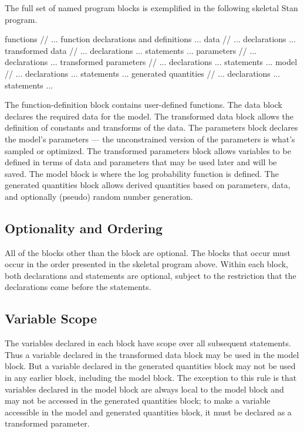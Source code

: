 The full set of named program blocks is exemplified in the following
skeletal Stan program.
%
\begin{stancode}
functions {
  // ... function declarations and definitions ...
}
data {
  // ... declarations ...
}
transformed data {
   // ... declarations ... statements ...
}
parameters {
   // ... declarations ...
}
transformed parameters {
   // ... declarations ... statements ...
}
model {
   // ... declarations ... statements ...
}
generated quantities {
   // ... declarations ... statements ...
}
\end{stancode}
%
The function-definition block contains user-defined functions.  The
data block declares the required data for the model.  The transformed
data block allows the definition of constants and transforms of the
data.  The parameters block declares the model's parameters --- the
unconstrained version of the parameters is what's sampled or
optimized.  The transformed parameters block allows variables to be
defined in terms of data and parameters that may be used later and
will be saved.  The model block is where the log probability function
is defined.  The generated quantities block allows derived quantities
based on parameters, data, and optionally (pseudo) random number
generation.


\subsection{Optionality and Ordering}

All of the blocks other than the  block are optional.  The
blocks that occur must occur in the order presented in the skeletal
program above.  Within each block, both declarations and statements
are optional, subject to the restriction that the declarations come
before the statements.

\subsection{Variable Scope}

The variables declared in each block have scope over all subsequent
statements.  Thus a variable declared in the transformed data block
may be used in the model block.  But a variable declared in the
generated quantities block may not be used in any earlier block,
including the model block.  The exception to this rule is that
variables declared in the model block are always local to the model
block and may not be accessed in the generated quantities block; to
make a variable accessible in the model and generated quantities
block, it must be declared as a transformed parameter.

